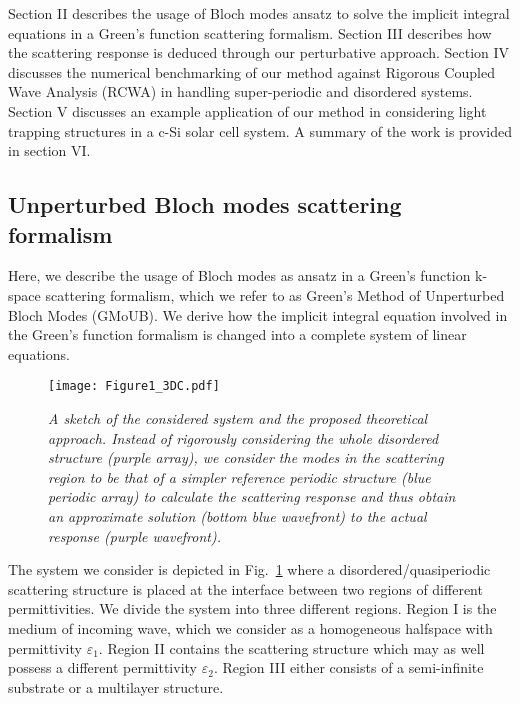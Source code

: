 \documentclass[ floatfix,reprint,amsmath,amssymb,aps,prb]{revtex4-1}
\begin{document}
Section II describes the usage of Bloch modes ansatz to solve the implicit integral equations in a Green's function scattering formalism. Section III describes how the scattering response is deduced through our perturbative  approach. Section IV discusses the numerical benchmarking of our method against Rigorous Coupled Wave Analysis (RCWA) in handling super-periodic and disordered systems. Section V discusses an example application of our method in considering light trapping structures in a c-Si solar cell system. A summary of the work is provided in section VI.
\begin{widetext}
\section{Unperturbed Bloch modes scattering formalism}

Here, we describe the usage of Bloch modes as ansatz in a Green's function k-space scattering formalism, which we refer to as Green's Method of Unperturbed Bloch Modes (GMoUB). We derive how  the implicit integral equation involved in the Green's function formalism is changed into a complete system of linear equations. 

\begin{figure}[h]
	\begin{center}
	\texttt{[image: Figure1\_3DC.pdf]}
	\caption{\textit{A sketch of the considered system and the proposed theoretical approach. Instead of rigorously considering the whole disordered structure  (purple array), we consider the modes in the scattering region to be that of a simpler reference periodic structure (blue periodic array)  to calculate the scattering response and thus obtain an approximate solution (bottom blue wavefront) to the actual response (purple wavefront).}}\label{fig1}
	\end{center}
\end{figure}

The system we consider is depicted in Fig.~\ref{fig1} where a disordered/quasiperiodic scattering structure is placed at the interface between two regions of different permittivities. We divide the system into three different regions. Region I is the medium of incoming wave, which we consider as a homogeneous halfspace with permittivity $\varepsilon_1$. Region II contains the scattering structure which may as well possess a different permittivity $\varepsilon_2$. Region III either consists of a semi-infinite substrate or a multilayer structure. 


\end{widetext}
\end{document}
